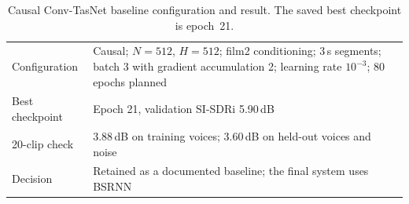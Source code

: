 \documentclass[11pt,a4paper]{article}
\newcommand{\sisdri}{SI-SDRi}
\begin{document}
\begin{table}[H]
\centering\footnotesize
\caption{Causal Conv-TasNet baseline configuration and result. The saved best checkpoint is
epoch~21.}
\label{tab:convtasnet}
\begin{tabularx}{\textwidth}{@{}lY@{}}
\toprule
Configuration & Causal; $N=512$, $H=512$; film2 conditioning; 3\,s segments; batch 3 with
gradient accumulation 2; learning rate $10^{-3}$; 80 epochs planned\\
Best checkpoint & Epoch 21, validation \sisdri{} 5.90\,dB\\
20-clip check & 3.88\,dB on training voices; 3.60\,dB on held-out voices and noise\\
Decision & Retained as a documented baseline; the final system uses BSRNN\\
\bottomrule
\end{tabularx}
\end{table}
\end{document}
